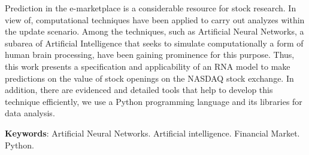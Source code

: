 \begin{resumo}[ABSTRACT]	
Prediction in the e-marketplace is a considerable resource for stock research. In view of, computational techniques have been applied to carry out analyzes within the update scenario. Among the techniques, such as Artificial Neural Networks, a subarea of Artificial Intelligence that seeks to simulate computationally a form of human brain processing, have been gaining prominence for this purpose. Thus, this work presents a specification and applicability of an RNA model to make predictions on the value of stock openings on the NASDAQ stock exchange. In addition, there are evidenced and detailed tools that help to develop this technique efficiently, we use a Python programming language and its libraries for data analysis.

\vspace{\onelineskip}
    
\noindent
\textbf{Keywords}: Artificial Neural Networks. Artificial intelligence. Financial Market. Python.
\end{resumo}
